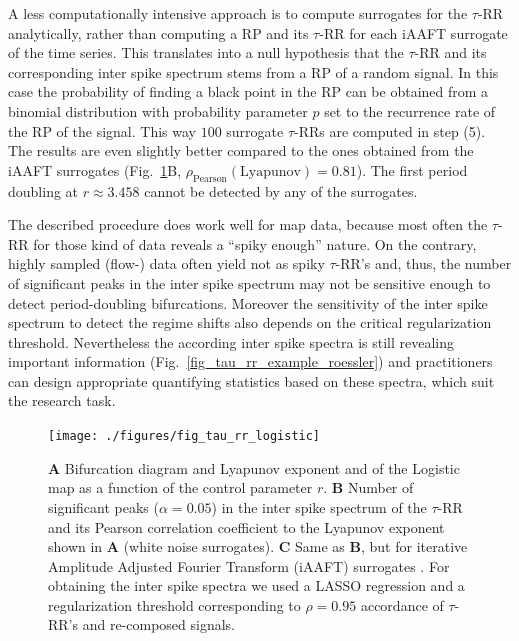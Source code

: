 \documentclass[entropy,article,submit,pdftex,moreauthors]{Definitions/mdpi}
\begin{document}
A less computationally intensive approach is to compute surrogates for the $\tau$-RR analytically, rather than computing a RP and its $\tau$-RR for each iAAFT surrogate of the 
time series. This translates into a null hypothesis 
that the $\tau$-RR and its corresponding inter spike spectrum stems from a RP of a random signal. In this case the probability of finding a black point in the RP can be obtained 
from a binomial distribution with probability parameter $p$ set to the recurrence rate of the RP of the signal. This way $100$ surrogate $\tau$-RRs are computed in step (5). 
The results are even slightly better compared to the ones obtained from the iAAFT surrogates (Fig.~\ref{fig_tau_rr_logistic}B, $\rho_{\text{Pearson}}(\text{Lyapunov})=0.81$). 
The first period doubling at $r \approx 3.458$ cannot be detected by any of the surrogates.

The described procedure does work well for map data, because most often the $\tau$-RR for those kind of data reveals a ``spiky enough'' nature. 
On the contrary, highly sampled (flow-) data often yield not as 
spiky $\tau$-RR's and, thus, the number of significant peaks in the inter spike spectrum may not be sensitive enough to detect period-doubling bifurcations. Moreover the sensitivity of the 
inter spike spectrum to detect the regime shifts also depends on the critical regularization threshold. Nevertheless the 
according inter spike spectra is still revealing important information (Fig.~\ref{fig_tau_rr_example_roessler}) and practitioners can design appropriate quantifying statistics based 
on these spectra, which suit the research task.

\begin{figure}
 \centering
 \texttt{[image: ./figures/fig\_tau\_rr\_logistic]}
 \caption{\textbf{A} Bifurcation diagram and Lyapunov exponent and of the Logistic map as a function of the control parameter $r$.
 \textbf{B} Number of significant peaks ($\alpha=0.05$) in the inter spike spectrum of the $\tau$-RR and its Pearson correlation coefficient to the Lyapunov exponent shown in \textbf{A} 
 (white noise surrogates). 
 \textbf{C} Same as \textbf{B}, but for iterative Amplitude Adjusted Fourier Transform (iAAFT) surrogates \cite{Schreiber1996,Schreiber2000}. For obtaining the inter spike spectra we used 
 a LASSO regression and a regularization threshold corresponding to $\rho=0.95$ accordance of $\tau$-RR's and re-composed signals.  
}
\label{fig_tau_rr_logistic}
\end{figure}


\end{document}
